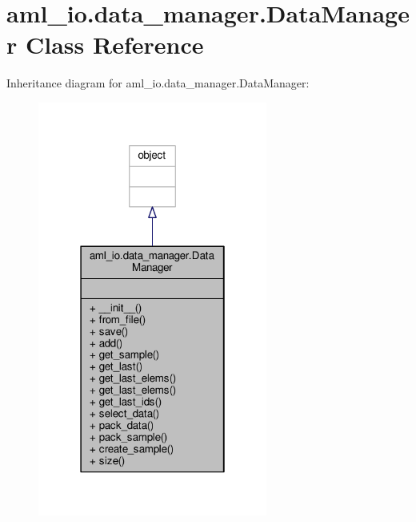 \hypertarget{classaml__io_1_1data__manager_1_1_data_manager}{\section{aml\-\_\-io.\-data\-\_\-manager.\-Data\-Manager Class Reference}
\label{classaml__io_1_1data__manager_1_1_data_manager}
}


Inheritance diagram for aml\-\_\-io.\-data\-\_\-manager.\-Data\-Manager\-:
\nopagebreak
\begin{figure}[H]
\begin{center}
\leavevmode
\includegraphics[width=214pt]{classaml__io_1_1data__manager_1_1_data_manager__inherit__graph}
\end{center}
\end{figure}


